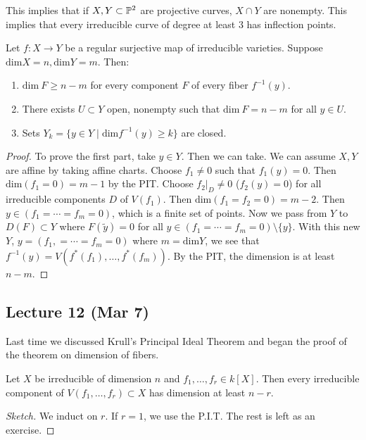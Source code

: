 \documentclass[twoside, 10pt]{article}
\begin{document}
    \begin{rmk}
        This implies that if $X,Y \subset \P^2$ are projective curves, $X \cap Y$ are nonempty. This implies that every irreducible curve of degree at least $3$ has inflection points.
    \end{rmk}

    \begin{thm}
        Let $f:X \to Y$ be a regular surjective map of irreducible varieties. Suppose $\mathrm{dim}X = n, \mathrm{dim}Y = m$. Then:
        \begin{enumerate}
            \item $\mathrm{dim}\ F \geq n-m$ for every component $F$ of every fiber $f^{-1}(y)$.
            \item There exists $U \subset Y$ open, nonempty such that $\mathrm{dim}\ F = n-m$ for all $y \in U$.
            \item Sets $Y_k = \{y \in Y \mid \mathrm{dim} f^{-1}(y) \geq k\}$ are closed.
        \end{enumerate}
        \begin{proof}
            To prove the first part, take $y \in Y$. Then we can take. We can assume $X,Y$ are affine by taking affine charts. Choose $f_1 \neq 0$ such that $f_1(y) = 0$. Then $\mathrm{dim}(f_1=0) = m-1$ by the PIT. Choose $f_2 |_D \neq 0$ ($f_2(y) = 0$) for all irreducible components $D$ of $V(f_1)$. Then $\mathrm{dim}(f_1=f_2=0) = m-2$. Then $y \in (f_1 = \cdots = f_m = 0)$, which is a finite set of points. Now we pass from $Y$ to $D(F) \subset Y$ where $F(\widetilde{y}) = 0$ for all $y \in (f_1 = \cdots = f_m = 0) \setminus \{y\}$. With this new $Y$, $y = (f_1, = \cdots = f_m = 0)$ where $m = \mathrm{dim}Y$, we see that $f^{-1}(y) = V(f^*(f_1), \ldots, f^*(f_m))$. By the PIT, the dimension is at least $n-m$.
        \end{proof}
    \end{thm}

    \subsection{Lecture 12 (Mar 7)}
    
    Last time we discussed Krull's Principal Ideal Theorem and began the proof of the theorem on dimension of fibers.

    \begin{cor}
        Let $X$ be irreducible of dimension $n$ and $f_1, \ldots, f_r \in k[X]$. Then every irreducible component of $V(f_1, \ldots, f_r) \subset X$ has dimension at least $n - r$.
        \begin{proof}[Sketch]
            We induct on $r$. If $r = 1$, we use the P.I.T. The rest is left as an exercise.
        \end{proof}
    \end{cor}
    
\end{document}
